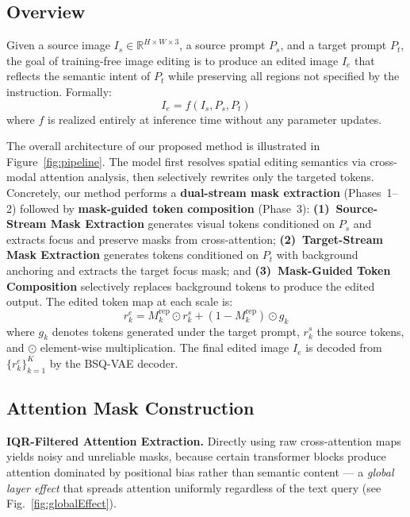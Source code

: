 \subsection{Overview}

Given a source image $I_s \in \mathbb{R}^{H \times W \times 3}$, a source prompt $P_s$, and a target prompt $P_t$, the goal of training-free image editing is to produce an edited image $I_e$ that reflects the semantic intent of $P_t$ while preserving all regions not specified by the instruction. Formally:
\begin{equation}
    I_e = f(I_s, P_s, P_t)
\end{equation}
where $f$ is realized entirely at inference time without any parameter updates.

The overall architecture of our proposed method is illustrated in Figure~\ref{fig:pipeline}. The model first resolves spatial editing semantics via cross-modal attention analysis, then selectively rewrites only the targeted tokens. Concretely, our method performs a \textbf{dual-stream mask extraction} (Phases~1--2) followed by \textbf{mask-guided token composition} (Phase~3): \textbf{(1)~Source-Stream Mask Extraction} generates visual tokens conditioned on $P_s$ and extracts focus and preserve masks from cross-attention; \textbf{(2)~Target-Stream Mask Extraction} generates tokens conditioned on $P_t$ with background anchoring and extracts the target focus mask; and \textbf{(3)~Mask-Guided Token Composition} selectively replaces background tokens to produce the edited output. The edited token map at each scale is:
\begin{equation}
    r_k^e = M_k^{\mathrm{rep}} \odot r_k^s + (1 - M_k^{\mathrm{rep}}) \odot g_k
\end{equation}
where $g_k$ denotes tokens generated under the target prompt, $r_k^s$ the source tokens, and $\odot$ element-wise multiplication. The final edited image $I_e$ is decoded from $\{r_k^e\}_{k=1}^{K}$ by the BSQ-VAE decoder.

\subsection{Attention Mask Construction}
\label{sec:mask_construction}


\noindent\textbf{IQR-Filtered Attention Extraction.}
Directly using raw cross-attention maps yields noisy and unreliable masks, because certain transformer blocks produce attention dominated by positional bias rather than semantic content — a \textit{global layer effect} that spreads attention uniformly regardless of the text query (see Fig.~\ref{fig:globalEffect}).

